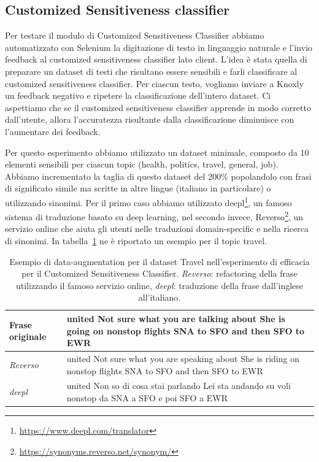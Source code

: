 \subsection{Customized Sensitiveness classifier}
\label{sec:qualCusto}
Per testare il modulo di Customized Sensitiveness Classifier abbiamo automatizzato con Selenium la digitazione di testo in linguaggio naturale e l'invio feedback al customized sensitiveness classifier lato client. L'idea è stata quella di preparare un dataset di testi che risultano essere sensibili e farli classificare al customized sensitiveness classifier. Per ciascun testo, vogliamo inviare a Knoxly un feedback negativo e ripetere la classificazione dell'intero dataset. Ci aspettiamo che se il customized sensitiveness classifier apprende in modo corretto dall'utente, allora l'accuratezza risultante dalla classificazione diminuisce con l'aumentare dei feedback.

Per questo esperimento abbiamo utilizzato un dataset minimale, composto da 10 elementi sensibili per ciascun topic (health, politics, travel, general, job). Abbiamo incrementato la taglia di questo dataset del 200\% popolandolo con frasi di significato simile ma scritte in altre lingue (italiano in particolare) o utilizzando sinonimi. Per il primo caso abbiamo utilizzato deepl\footnote{\url{https://www.deepl.com/translator}}, un famoso sistema di traduzione basato su deep learning, nel secondo invece, Reverso\footnote{\url{https://synonyms.reverso.net/synonym/}}, un servizio online che aiuta gli utenti nelle traduzioni domain-specific e nella ricerca di sinonimi. In tabella~\ref{tab:datasetcustomized} ne è riportato un esempio per il topic travel.


\begin{table}[h!t]
\centering
\begin{tabular}{l|p{9cm}}
\toprule
\textbf{Frase originale} & united Not sure what you are talking about She is going on nonstop flights SNA to SFO and then SFO to EWR \\
\midrule
\textit{Reverso} & united Not sure what you are speaking about She is riding on nonstop flights SNA to SFO and then SFO to EWR \\ 
\midrule
\textit{deepl} & united Non so di cosa stai parlando Lei sta andando su voli nonstop da SNA a SFO e poi SFO a EWR \\
\bottomrule
\end{tabular}
\caption{Esempio di data-augmentation per il dataset Travel nell'esperimento di efficacia per il Customized Sensitiveness Classifier. \textit{Reverso}: refactoring della frase utilizzando il famoso servizio online, \textit{deepl}: traduzione della frase dall'inglese all'italiano.}
\label{tab:datasetcustomized}
\end{table}
\FloatBarrier

